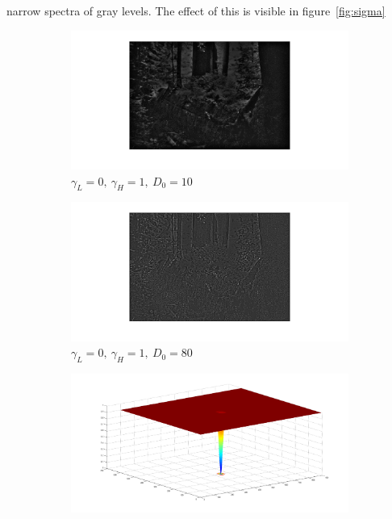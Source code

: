 		narrow spectra of gray levels. The effect of this is visible in figure~\ref{fig:sigma}
		\begin{figure}[h!]
			\centering
			\begin{subfigure}[b]{0.5\textwidth}
				\includegraphics[width=\textwidth]{pics/low_sigma.png}
				\caption{$\gamma_L = 0,~\gamma_H = 1,~D_0 = 10$}
				\label{fig:low_sigma}
			\end{subfigure}%
			\begin{subfigure}[b]{0.5\textwidth}
				\includegraphics[width=\textwidth]{pics/high_sigma.png}
				\caption{$\gamma_L = 0,~\gamma_H = 1,~D_0 =80$}
				\label{fig:high_sigma}
			\end{subfigure}
			\label{fig:sigma}
			\begin{subfigure}[b]{0.5\textwidth}
				\includegraphics[width=\textwidth]{pics/low_sigma_filter.png}

\end{subfigure}
\end{figure}
